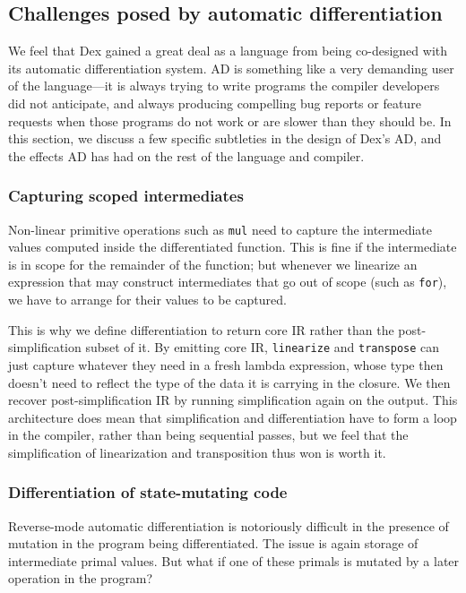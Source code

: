 \documentclass[acmsmall,screen,nonacm]{acmart}
\newcommand{\ttt}[1]{\texttt{#1}}
\begin{document}
\subsection{Challenges posed by automatic differentiation}
\label{sec:ad-lessons}

We feel that Dex gained a great deal as a language from being co-designed with its automatic differentiation system.
AD is something like a very demanding user of the language---it is always trying to write programs the compiler developers did not anticipate, and always producing compelling bug reports or feature requests when those programs do not work or are slower than they should be.
In this section, we discuss a few specific subtleties in the design of Dex's AD, and the effects AD has had on the rest of the language and compiler.

\subsubsection{Capturing scoped intermediates}
\label{sec:capturing-scoped-intermediates}
Non-linear primitive operations such as \texttt{mul} need to capture the intermediate values computed inside the differentiated function.
This is fine if the intermediate is in scope for the remainder of the function; but whenever we linearize an expression that may construct intermediates that go out of scope (such as \texttt{for}), we have to arrange for their values to be captured.

This is why we define differentiation to return core IR rather than the post-simplification subset of it.
By emitting core IR, \ttt{linearize} and \ttt{transpose} can just capture whatever they need in a fresh lambda expression, whose type then doesn't need to reflect the type of the data it is carrying in the closure.
We then recover post-simplification IR by running simplification again on the output.
This architecture does mean that simplification and differentiation have to form a loop in the compiler, rather than being sequential passes, but we feel that the simplification of linearization and transposition thus won is worth it.

\subsubsection{Differentiation of state-mutating code}
\label{sec:ad-through-state}
Reverse-mode automatic differentiation is notoriously difficult in the presence of mutation in the program being differentiated.
The issue is again storage of intermediate primal values.
But what if one of these primals is mutated by a later operation in the program?
\end{document}
